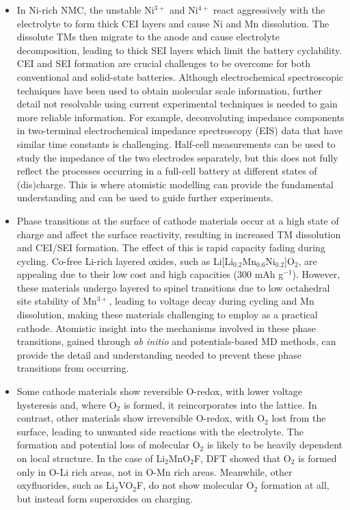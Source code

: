 \documentclass[../main.tex]{subfiles}
\begin{document}
\begin{itemize}
    \item In Ni-rich NMC, the unstable Ni$^{3+}$ and Ni$^{4+}$ react aggressively with the electrolyte to form thick CEI layers and cause Ni and Mn dissolution. The dissolute TMs then migrate to the anode and cause electrolyte decomposition, leading to thick SEI layers which limit the battery cyclability.\cite{li2017dynamic,li2018mn} CEI and SEI formation are crucial challenges to be overcome for both conventional and solid-state batteries. Although electrochemical spectroscopic techniques have been used to obtain molecular scale information, further detail not resolvable using current experimental techniques is needed to gain more reliable information.\cite{middlemiss2020characterisation} For example, deconvoluting impedance components in two-terminal electrochemical impedance spectroscopy (EIS) data that have similar time constants is challenging.\cite{li2001studies} Half-cell  measurements can be used to study the impedance of the two electrodes separately, but this does not fully reflect the processes occurring in a full-cell battery at different states of (dis)charge.\cite{song2002two} This is where atomistic modelling can provide the fundamental understanding and can be used to guide further experiments.
    \item Phase transitions at the surface of cathode materials occur at a high state of charge and affect the surface reactivity, resulting in increased TM dissolution and CEI/SEI formation. The effect of this is rapid capacity fading during cycling.\cite{li2019comprehensive} Co-free Li-rich layered oxides, such as Li[Li$_{0.2}$Mn$_{0.6}$Ni$_{0.2}$]O$_{2}$, are appealing due to their low cost and high capacities (300 mAh g$^{-1}$).\cite{kim2004electrochemical,armstrong2006demonstrating} However, these materials undergo layered to spinel transitions due to low octahedral site stability of Mn$^{3+}$, leading to voltage decay during cycling and Mn dissolution,\cite{MnDissolution2016} making these materials challenging to employ as a practical cathode. Atomistic insight into the mechanisms involved in these phase transitions, gained through \textit{ab initio} and potentials-based MD methods, can provide the detail and understanding needed to prevent these phase transitions from occurring.
    \item Some cathode materials show reversible O-redox, with lower voltage hysteresis and, where O$_2$ is formed, it reincorporates into the lattice.\cite{Sharpe2020} In contrast, other materials show irreversible O-redox, with O$_2$ lost from the surface,\cite{Nakayama2020, Chen2016, House2020a} leading to unwanted side reactions with the electrolyte. The formation and potential loss of molecular O$_2$ is likely to be heavily dependent on local structure. In the case of Li$_2$MnO$_2$F, DFT showed that O$_2$ is formed only in O-Li rich areas, not in O-Mn rich areas.\cite{Sharpe2020} Meanwhile, other oxyfluorides, such as Li$_2$VO$_2$F, do not show molecular O$_2$ formation at all, but instead form superoxides on charging.\cite{Chang2020} 
\end{itemize}
\end{document}
